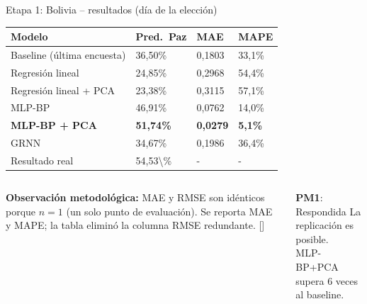 \begin{frame}{Etapa 1: Bolivia -- resultados (día de la elección)}
  \vspace{-0.1em}
  \begin{center}
  \small
  \begin{tabular}{L{4.2cm} C{2.0cm} C{1.6cm} C{1.6cm}}
    \toprule
    {\color{white}\textbf{Modelo}} &
    {\color{white}\textbf{Pred.\ Paz}} &
    {\color{white}\textbf{MAE}} &
    {\color{white}\textbf{MAPE}} \\
    \midrule
    Baseline (última encuesta) & 36,50\% & 0,1803 & 33,1\% \\
    Regresión lineal           & 24,85\% & 0,2968 & 54,4\% \\
    Regresión lineal + PCA     & 23,38\% & 0,3115 & 57,1\% \\
    MLP-BP                     & 46,91\% & 0,0762 & 14,0\% \\
    \textbf{MLP-BP + PCA}      & \textbf{51,74\%} & \textbf{0,0279} & \textbf{5,1\%} \\
    GRNN                       & 34,67\% & 0,1986 & 36,4\% \\
    \midrule
    Resultado real             & \num{54,53\%} & {-} & {-} \\
    \bottomrule
  \end{tabular}
  \end{center}

  \vspace{0.2em}
  \begin{columns}[T]
    \begin{column}{0.55\textwidth}
      \small
      \textbf{Observación metodológica:} MAE y RMSE son idénticos porque $n=1$
      (un solo punto de evaluación). Se reporta MAE y MAPE; la tabla eliminó
      la columna RMSE redundante. []
    \end{column}
    \begin{column}{0.41\textwidth}
      \begin{block}{\textbf{PM1}: Respondida}
        \small La replicación es posible.\\
        MLP-BP+PCA supera 6 veces al baseline.
      \end{block}
    \end{column}
  \end{columns}
\end{frame}

